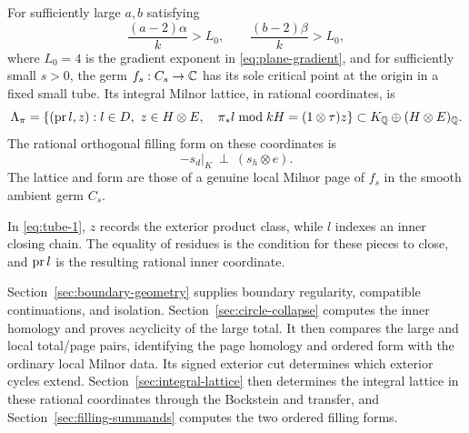 \begin{theorem}\label{thm:tube}
For sufficiently large \(a,b\) satisfying
\[
 \frac{(a-2)\alpha}{k}>L_0,\qquad
 \frac{(b-2)\beta}{k}>L_0,
\]
where \(L_0=4\) is the gradient exponent in
\eqref{eq:plane-gradient}, and for sufficiently small \(s>0\), the germ
\(f_s:C_s\to\mathbb C\) has its sole critical point at the origin in a fixed
small tube. Its integral Milnor lattice, in rational coordinates, is
\begin{equation}
\Lambda_\pi=
\left\{(\operatorname{pr} l,z): l\in D,\ z\in H\otimes E,\quad
\pi_*l\bmod kH=(1\otimes\tau)z\right\}
\subset K_\mathbb Q\oplus(H\otimes E)_\mathbb Q.
\label{eq:tube-1}
\end{equation}
The rational orthogonal filling form on these coordinates is
\begin{equation}
  -s_d|_K\ \perp\ (s_h\otimes e).
\label{eq:tube-2}
\end{equation}
The lattice and form are those of a genuine local Milnor page of
\(f_s\) in the smooth ambient germ \(C_s\).
\end{theorem}

In \eqref{eq:tube-1}, \(z\) records the exterior product class,
while \(l\) indexes an inner closing chain. The equality of residues
is the condition for these pieces to close, and \(\operatorname{pr} l\) is the
resulting rational inner coordinate.

Section~\ref{sec:boundary-geometry} supplies boundary regularity,
compatible continuations, and isolation.
Section~\ref{sec:circle-collapse} computes the inner homology and
proves acyclicity of the large total. It then compares the large and
local total/page pairs, identifying the page homology and ordered
form with the ordinary local Milnor data. Its signed exterior cut
determines which exterior cycles extend.
Section~\ref{sec:integral-lattice}
then determines the integral lattice in these rational coordinates through the
Bockstein and transfer, and Section~\ref{sec:filling-summands}
computes the two ordered filling forms.
